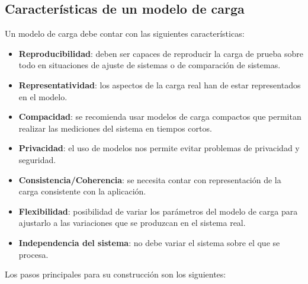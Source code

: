 \subsection{Características de un modelo de carga}
Un modelo de carga debe contar con las siguientes características:
\begin{itemize}
	\item \textbf{Reproducibilidad}: deben ser capaces de reproducir la carga de prueba sobre todo en situaciones de ajuste de sistemas o de comparación de sistemas.
	\item \textbf{Representatividad}: los aspectos de la carga real han de estar representados en el modelo.
	\item \textbf{Compacidad}: se recomienda usar modelos de carga compactos que permitan realizar las mediciones del sistema en tiempos cortos.
	\item \textbf{Privacidad}: el uso de modelos nos permite evitar problemas de privacidad y seguridad.
	\item \textbf{Consistencia/Coherencia}: se necesita contar con representación de la carga consistente con la aplicación.
	\item \textbf{Flexibilidad}: posibilidad de variar los parámetros del modelo de carga para ajustarlo a las variaciones que se produzcan en el sistema real.
	\item \textbf{Independencia del sistema}: no debe variar el sistema sobre el que se procesa.
\end{itemize}
\newpage
Los pasos principales para su construcción son los siguientes:

